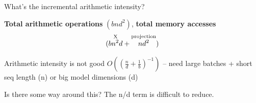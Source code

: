 What's the incremental arithmetic intensity?

\bigskip
\textbf{Total arithmetic operations} $(bnd^2)$, \textbf{total memory accesses}
\[ (\overset{\text{\scriptsize X}}{bn^2 d} + \overset{\text{\scriptsize projection}}{nd^2}) \]

\bigskip
Arithmetic intensity is not good $O\left(\left(\frac{n}{d} + \frac{1}{b}\right)^{-1}\right)$ -- need large batches + short seq length (n) or big model dimensions (d)

\bigskip
Is there some way around this? The n/d term is difficult to reduce.
